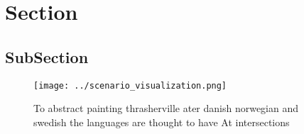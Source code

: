 \documentclass[a4paper]{article}
\begin{document}
\section{Section}

\subsection{SubSection}

\begin{figure}
\centering
\texttt{[image: ../scenario\_visualization.png]}
\caption{To abstract painting thrasherville ater danish norwegian and swedish the languages are thought to have At intersections
}
\end{figure}
 
\end{document}
